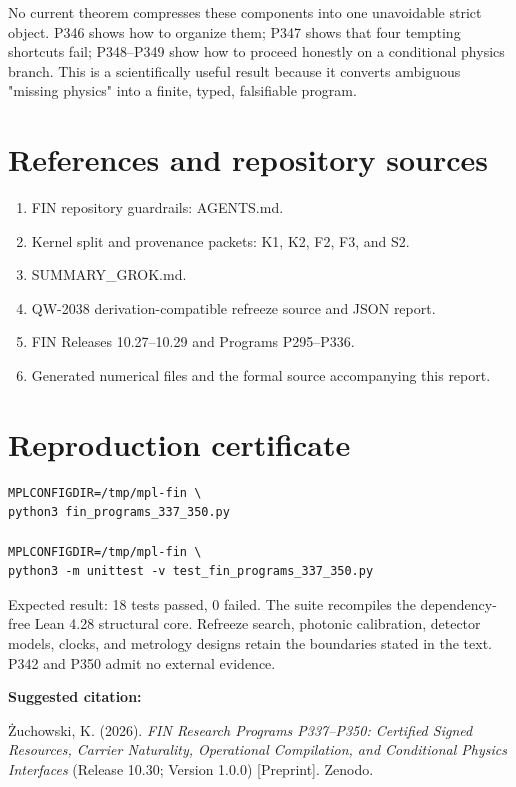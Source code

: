\documentclass[11pt,a4paper,openany]{report}
\begin{document}
No current theorem compresses these components into one unavoidable strict object. P346 shows how to organize them; P347 shows that four tempting shortcuts fail; P348--P349 show how to proceed honestly on a conditional physics branch. This is a scientifically useful result because it converts ambiguous "missing physics" into a finite, typed, falsifiable program.

\chapter{References and repository sources}

\begin{enumerate}
\item 
FIN repository guardrails: AGENTS.md.

\item 
Kernel split and provenance packets: K1, K2, F2, F3, and S2.

\item 
SUMMARY\_GROK.md.

\item 
QW-2038 derivation-compatible refreeze source and JSON report.

\item 
FIN Releases 10.27--10.29 and Programs P295--P336.

\item 
Generated numerical files and the formal source accompanying this report.

\end{enumerate}


\clearpage
\chapter*{Reproduction certificate}
\begin{Verbatim}[fontsize=\small]
MPLCONFIGDIR=/tmp/mpl-fin \
python3 fin_programs_337_350.py

MPLCONFIGDIR=/tmp/mpl-fin \
python3 -m unittest -v test_fin_programs_337_350.py
\end{Verbatim}
Expected result: 18 tests passed, 0 failed.  The suite recompiles the
dependency-free Lean 4.28 structural core.  Refreeze search, photonic
calibration, detector models, clocks, and metrology designs retain the
boundaries stated in the text.  P342 and P350 admit no external evidence.

\medskip
\noindent\textbf{Suggested citation:}

\.Zuchowski, K. (2026). \emph{FIN Research Programs P337--P350:
Certified Signed Resources, Carrier Naturality, Operational Compilation, and
Conditional Physics Interfaces} (Release 10.30; Version 1.0.0) [Preprint].
Zenodo.
\end{document}
